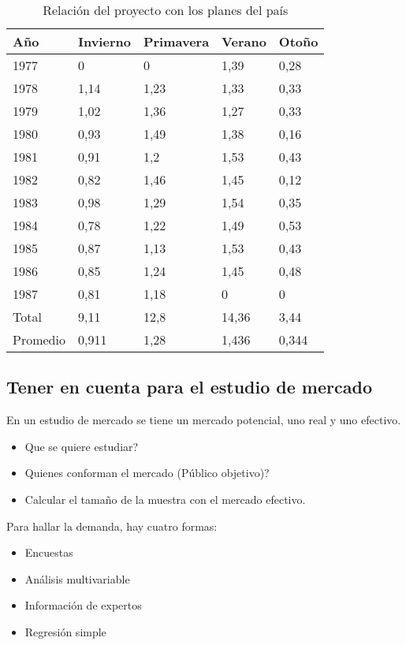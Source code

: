 \documentclass[a4paper, 11pt, oneside]{article}
\begin{document}
\begin{table}
	\begin{center}
	\caption{Relación del proyecto con los planes del país}
	\begin{tabular}{ | p{1.5cm} | p{1.5cm} | p{1.5cm} | p{1.5cm} | p{1.5cm} | }
	\hline
	Año & Invierno & Primavera & Verano & Otoño\\
	\hline
	1977 & 0 & 0 & 1,39 & 0,28\\
	\hline
	1978 & 1,14 & 1,23 & 1,33 & 0,33\\
	\hline
	1979 & 1,02 & 1,36 & 1,27 & 0,33\\
	\hline
	1980 & 0,93 & 1,49 & 1,38 & 0,16\\
	\hline
	1981 & 0,91 & 1,2 & 1,53 & 0,43\\
	\hline
	1982 & 0,82 & 1,46 & 1,45 & 0,12\\
	\hline
	1983 & 0,98 & 1,29 & 1,54 & 0,35\\
	\hline
	1984 & 0,78 & 1,22 & 1,49 & 0,53\\
	\hline
	1985 & 0,87 & 1,13 & 1,53 & 0,43\\
	\hline
	1986 & 0,85 & 1,24 & 1,45 & 0,48\\
	\hline
	1987 & 0,81 & 1,18 & 0 & 0\\
	\hline
	Total & 9,11 & 12,8 & 14,36 & 3,44\\
	\hline
	Promedio & 0,911 & 1,28 & 1,436 & 0,344\\
	\hline
	\end{tabular}
	\end{center}
	\label{nacional}
\end{table}

\subsection{Tener en cuenta para el estudio de mercado}
En un estudio de mercado se tiene un mercado potencial, uno real y uno efectivo.

\begin{itemize}
	\item Que se quiere estudiar?
	\item Quienes conforman el mercado (Público objetivo)?
	\item Calcular el tamaño de la muestra con el mercado efectivo.
\end{itemize}

Para hallar la demanda, hay cuatro formas:

\begin{itemize}
	\item Encuestas
	\item Análisis multivariable
	\item Información de expertos
	\item Regresión simple
\end{itemize}
\end{document}

